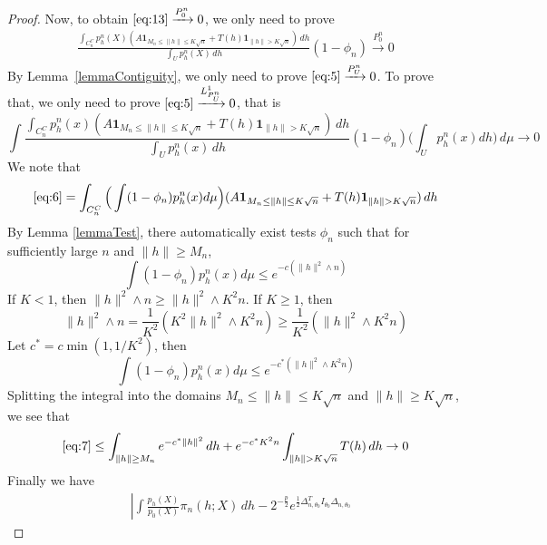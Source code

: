 \begin{proof}
Now, to obtain $\eqref{eq:13}\xrightarrow{P_0^n}0$, we only need to prove
\begin{equation}\label{eq:5}
    \begin{aligned}
        \frac{\int_{C_n^C}p_h^n(X)(A\textbf{1}_{M_n\leq \|h\|\leq K\sqrt{n}}+T(h)\textbf{1}_{\|h\|> K\sqrt{n}})\, dh}{\int_U p_h^n(X)\, dh}(1-\phi_n)\xrightarrow{P_0^n} 0
    \end{aligned}
\end{equation}
By Lemma~\ref{lemmaContiguity}, we only need to prove $\eqref{eq:5}\xrightarrow{P_U^n}0$. To prove that, we only need to prove $\eqref{eq:5}\xrightarrow{L^1_{P_U^n}}0$, that is 
\begin{equation}\label{eq:6}
    \int \frac{\int_{C_n^C}p_h^n(x)(A\textbf{1}_{M_n\leq \|h\|\leq K\sqrt{n}}+T(h)\textbf{1}_{\|h\|> K\sqrt{n}})\, dh}{\int_U p_h^n(x)\, dh}(1-\phi_n)\big(\int_U p_h^n(x)dh\big) \, d\mu  \to 0
\end{equation}
We note that
\begin{equation}\label{eq:7}
    \eqref{eq:6}=\int_{C_n^C} \Big(\int (1-\phi_n)p_h^n(x)d\mu\Big) (A\textbf{1}_{M_n\leq \|h\|\leq K\sqrt{n}}+T(h)\textbf{1}_{\|h\|> K\sqrt{n}})\, dh 
\end{equation}
By Lemma \ref{lemmaTest}, there automatically exist tests $\phi_n$  such that for sufficiently large $n$ and $\|h\|\geq M_n$,
\begin{equation}
\int (1-\phi_n)p^n_h(x)d\mu\leq e^{-c(\|h\|^2\wedge n)}
\end{equation}
If $K< 1$, then $\|h\|^2\wedge n\geq \|h\|^2\wedge K^2n$. If $K\geq 1$, then
\begin{equation}
    \|h\|^2\wedge n=\frac{1}{K^2}(K^2\|h\|^2\wedge K^2n)\geq \frac{1}{K^2}(\|h\|^2\wedge K^2n)
\end{equation}
Let $c^*=c\min(1,1/K^2)$, then
\begin{equation}
\int (1-\phi_n)p^n_h(x)d\mu\leq e^{-c^*(\|h\|^2\wedge K^2n)}
\end{equation}
Splitting the integral into the domains $M_n\leq \|h\|\leq K\sqrt{n}$ and $\|h\|\geq K\sqrt{n}$, we see that
\begin{equation}
    \eqref{eq:7}\leq \int_{\|h\|\geq M_n}e^{-c^*\|h\|^2}\, dh + e^{-c^*K^2n}\int_{\|h\|>K\sqrt{n}} T(h)\, dh  \to 0
\end{equation}
Finally we have
\begin{equation}
    \begin{aligned}
        &\left|\int \frac{p_h(X)}{p_0(X)}\pi_n (h;X) \, dh-2^{-\frac{p}{2}}e^{\frac{1}{2}\Delta_{n,\theta_0}^TI_{\theta_0}\Delta_{n,\theta_0}}

\end{aligned}
\end{equation}
\end{proof}
